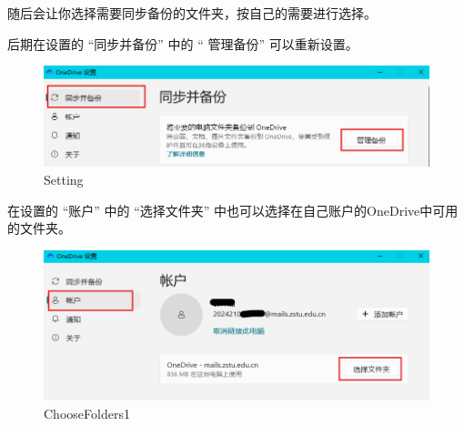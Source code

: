 \documentclass[]{ctexbook}
\theoremstyle{definition}
\theoremstyle{definition}
\theoremstyle{definition}
\theoremstyle{definition}
\theoremstyle{remark}
\begin{document}
随后会让你选择需要同步备份的文件夹，按自己的需要进行选择。

后期在设置的 ``同步并备份'' 中的 `` 管理备份'' 可以重新设置。

\begin{figure}

{\centering \includegraphics[width=1\linewidth]{img/OneDrive/Setting} 

}

\caption{Setting}\label{fig:OneDrive-Setting}
\end{figure}

在设置的 ``账户'' 中的 ``选择文件夹'' 中也可以选择在自己账户的OneDrive中可用的文件夹。

\begin{figure}

{\centering \includegraphics[width=1\linewidth]{img/OneDrive/ChooseFolders1} 

}

\caption{ChooseFolders1}\label{fig:OneDrive-ChooseFolders1}
\end{figure}
\end{document}
